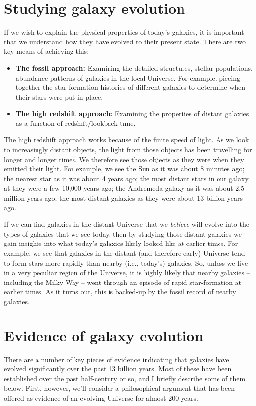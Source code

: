 \documentclass[11pt]{article}
\begin{document}
\section{Studying galaxy evolution}
If we wish to explain the physical properties of today's galaxies, it
is important that we understand how they have evolved to their present
state. There are two key means of achieving this:
\begin{itemize}
\item {\bf The fossil approach:} Examining the detailed structures,
  stellar populations, abundance patterns of galaxies in the local
  Universe. For example, piecing together the star-formation histories
  of different galaxies to determine when their stars were put in place.
\item {\bf The high redshift approach:} Examining the properties of distant galaxies as a function of redshift/lookback time.
\end{itemize}
The high redshift approach works because of the finite speed of
light. As we look to increasingly distant objects, the light from
those objects has been travelling for longer and longer times. We
therefore see those objects as they were when they emitted their
light. For example, we see the Sun as it was about 8 minutes ago; the
nearest star as it was about 4 years ago; the most distant stars in
our galaxy at they were a few 10,000 years ago; the Andromeda galaxy
as it was about 2.5 million years ago; the most distant galaxies as
they were about 13 billion years ago.

If we can find galaxies in the distant Universe that we {\it believe}
will evolve into the types of galaxies that we see today, then by
studying those distant galaxies we gain insights into what today's
galaxies likely looked like at earlier times. For example, we see that
galaxies in the distant (and therefore early) Universe tend to form
stars more rapidly than nearby (i.e., today's) galaxies. So, unless we
live in a very peculiar region of the Universe, it is highly likely
that nearby galaxies -- including the Milky Way -- went through an
episode of rapid star-formation at earlier times. As it turns out,
this is backed-up by the fossil record of nearby galaxies. 

\section{Evidence of galaxy evolution}
There are a number of key pieces of evidence indicating that galaxies
have evolved significantly over the past 13 billion years. Most of
these have been established over the past half-century or so, and I
briefly describe some of them below. First, however, we'll consider a
philosophical argument that has been offered as evidence of an
evolving Universe for almost 200 years.
\end{document}
